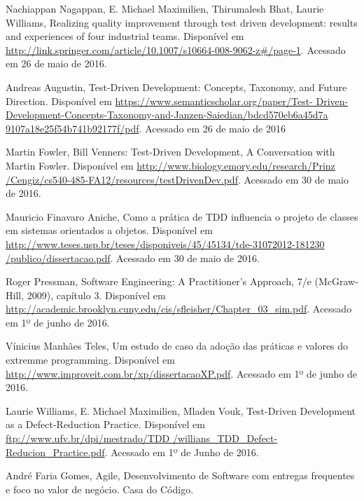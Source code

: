 \documentclass[12pt]{article}
\begin{document}
  \begin{flushleft}
  Nachiappan Nagappan, E. Michael Maximilien, Thirumalesh Bhat,
  Laurie Williams, Realizing quality improvement through test driven 
  development: results and experiences of four industrial teams. Disponível em
  \url{http://link.springer.com/article/10.1007/s10664-008-9062-z#/page-1}.
  Acessado em 26 de maio de 2016.

  Andreas Augustin, Test-Driven Development: Concepts, Taxonomy, and Future 
  Direction. Disponível em \url{https://www.semanticscholar.org/paper/Test-
  Driven-Development-Concepts-Taxonomy-and-Janzen-Saiedian/bdcd570eb6a45d7a
  9107a18e25f54b741b92177f/pdf}. Acessado em 26 de maio de 2016

  Martin Fowler, Bill Venners: Test-Driven Development, A Conversation with 
  Martin Fowler. Disponível em \url{http://www.biology.emory.edu/research/Prinz
  /Cengiz/cs540-485-FA12/resources/testDrivenDev.pdf}. Acessado em 30 de maio de
  2016.

  Mauricio Finavaro Aniche, Como a prática de TDD influencia o projeto de 
  classes em sistemas orientados a objetos. Disponível em 
  \url{http://www.teses.usp.br/teses/disponiveis/45/45134/tde-31072012-181230
  /publico/dissertacao.pdf}. Acessado em 30 de maio de 2016.

  Roger Pressman, Software Engineering: A Practitioner’s Approach, 7/e 
  (McGraw-Hill, 2009), capítulo 3.  Disponível em
  \url{http://academic.brooklyn.cuny.edu/cis/sfleisher/Chapter_03_sim.pdf}.
  Acessado em 1º de junho de 2016.

  Vínicius Manhães Teles, Um estudo de caso da adoção das práticas e valores do
  extremme programming. Disponível em
  \url{http://www.improveit.com.br/xp/dissertacaoXP.pdf}. Acessado em 1º de 
  junho de 2016.

  Laurie Williams, E. Michael Maximilien, Mladen Vouk, Test-Driven Development 
  as a Defect-Reduction Practice. Disponível em 
  \url{ftp://www.ufv.br/dpi/mestrado/TDD
  /willians_TDD_Defect-Reducion_Practice.pdf}. Acessado em 1º de Junho de 2016.

  André Faria Gomes, Agile, Desenvolvimento de Software com entregas frequentes
  e foco no valor de negócio. Casa do Código.
  
  \end{flushleft}
\end{document}
